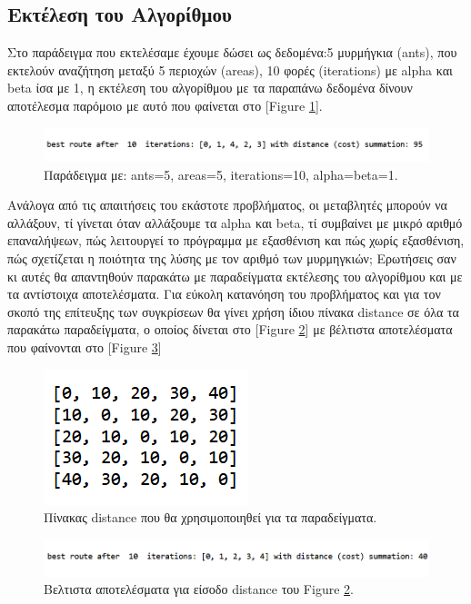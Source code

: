 \subsection{Εκτέλεση του Αλγορίθμου}
Στο παράδειγμα που εκτελέσαμε έχουμε δώσει ως δεδομένα:5 μυρμήγκια (ants), που εκτελούν αναζήτηση μεταξύ 5 περιοχών (areas), 10 φορές (iterations) με alpha και beta ίσα με 1, η εκτέλεση του αλγορίθμου με τα παραπάνω δεδομένα δίνουν αποτέλεσμα παρόμοιο με αυτό που φαίνεται στο [Figure \ref{12}].

\begin{figure}
    \centering
    \includegraphics[scale=0.65]{2947_thesis/pictures/ex1.png} 
    \caption{Παράδειγμα με: ants=5, areas=5, iterations=10, alpha=beta=1.}
    \label{12}
\end{figure}

Ανάλογα από τις απαιτήσεις του εκάστοτε προβλήματος, οι μεταβλητές μπορούν να αλλάξουν, τί γίνεται όταν αλλάξουμε τα alpha και beta, τί συμβαίνει με μικρό αριθμό επαναλήψεων, πώς λειτουργεί το πρόγραμμα με εξασθένιση και πώς χωρίς εξασθένιση, πώς σχετίζεται η ποιότητα της λύσης με τον αριθμό των μυρμηγκιών; Ερωτήσεις σαν κι αυτές θα απαντηθούν παρακάτω με παραδείγματα εκτέλεσης του αλγορίθμου και με τα αντίστοιχα αποτελέσματα. 
Για εύκολη κατανόηση του προβλήματος και για τον σκοπό της επίτευξης των συγκρίσεων θα γίνει χρήση ίδιου πίνακα distance σε όλα τα παρακάτω παραδείγματα, ο οποίος δίνεται στο [Figure \ref{13}] με βέλτιστα αποτελέσματα που φαίνονται στο [Figure \ref{14}]
\begin{figure}
    \centering
    \includegraphics[scale=1]{2947_thesis/pictures/distance.png} 
    \caption{Πίνακας distance που θα χρησιμοποιηθεί για τα παραδείγματα.}
    \label{13}
\end{figure}
\begin{figure}
    \centering
    \includegraphics[scale=0.65]{2947_thesis/pictures/ex2.png} 
    \caption{Βελτιστα αποτελέσματα για είσοδο distance του Figure \ref{13}.}
    \label{14}
\end{figure}

